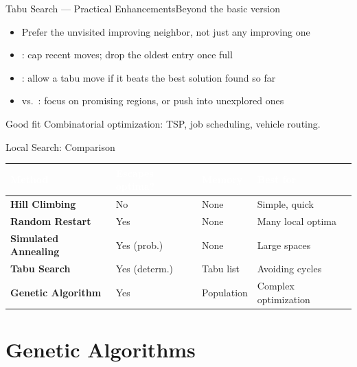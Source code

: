 \documentclass[aspectratio=169,11pt]{beamer}
\begin{document}
\begin{frame}{Tabu Search — Practical Enhancements}{Beyond the basic version}
  \begin{itemize}\small
    \item Prefer the  unvisited improving neighbor, not just any improving one
    \item {}: cap recent moves; drop the oldest entry once full
    \item {}: allow a tabu move if it beats the best solution found so far
    \item {} vs.\ : focus on promising regions,
      or push into unexplored ones
  \end{itemize}
  \begin{exampleblock}{Good fit}
    \small Combinatorial optimization: TSP, job scheduling, vehicle routing.
  \end{exampleblock}
\end{frame}

\begin{frame}{Local Search: Comparison}{}
  \small
  \renewcommand{\arraystretch}{1.3}
  \begin{center}
  \begin{tabularx}{\textwidth}{@{}>{\bfseries}l >{\raggedright\arraybackslash}X >{\raggedright\arraybackslash}X >{\raggedright\arraybackslash}X@{}}
    \toprule
    \rowcolor{PrimaryDark}
    \textcolor{white}{Method} & \textcolor{white}{Escapes optima?} &
    \textcolor{white}{Memory} & \textcolor{white}{Best for} \\
    \midrule
    Hill Climbing & No & None & Simple, quick \\
    \rowcolor{PrimaryLight!25}
    Random Restart & Yes & None & Many local optima \\
    Simulated Annealing & Yes (prob.) & None & Large spaces \\
    \rowcolor{PrimaryLight!25}
    Tabu Search & Yes (determ.) & Tabu list & Avoiding cycles \\
    Genetic Algorithm & Yes & Population & Complex optimization \\
    \bottomrule
  \end{tabularx}
  \end{center}
\end{frame}

\section{Genetic Algorithms}
\end{document}
